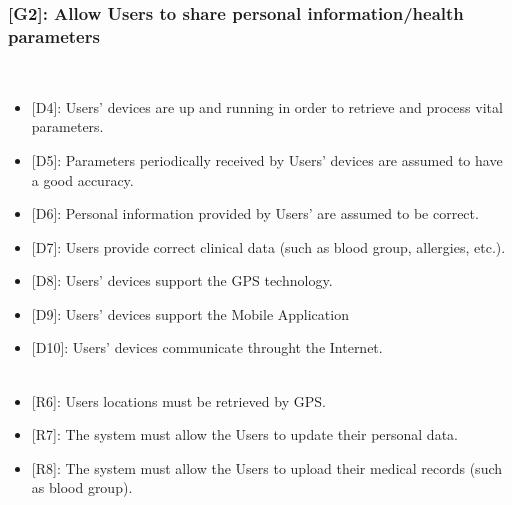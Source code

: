 \documentclass[12pt,a4paper]{article}
\begin{document}
	\subsubsection*{{[}{G2}{]}: Allow Users to share personal information/health parameters}
	\begin{itemize}\\
		\begin{itemize}
			\item {[D4]}: Users' devices are up and running in order to retrieve and process vital parameters.
			\item {[D5]}: Parameters periodically received by Users' devices are assumed to have a good accuracy.
			\item {[D6]}: Personal information provided by Users' are assumed to be correct.
			\item {[D7]}: Users provide correct clinical data (such as blood group, allergies, etc.).
			\item {[D8]}: Users' devices support the GPS technology.
			\item {[D9]}: Users' devices support the Mobile Application
			\item {[D10]}: Users' devices communicate throught the Internet.
			\\ \\
			\item {[R6]}: Users locations must be retrieved by GPS.
			\item {[R7]}: The system must allow the Users to update their personal data.
			\item {[R8]}: The system must allow the Users to upload their medical records (such as blood group).
		\end{itemize}
	\end{itemize}
\end{document}
